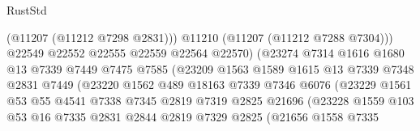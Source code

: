 \begin{lexlean}{RustStd}
\begin{coremodule}
                                      (@11207 (@11212 @7298 @2831)))
                                    @11210
                                    (@11207 (@11212 @7288 @7304)))
                                  @22549
                                  @22552
                                  @22555
                                  @22559
                                  @22564
                                  @22570)
                                (@23274
                                  @7314
                                  @1616
                                  @1680
                                  @13
                                  @7339
                                  @7449
                                  @7475
                                  @7585
                                  (@23209
                                    @1563
                                    @1589
                                    @1615
                                    @13
                                    @7339
                                    @7348
                                    @2831
                                    @7449
                                    (@23220
                                      @1562
                                      @489
                                      @18163
                                      @7339
                                      @7346
                                      @6076
                                      (@23229
                                        @1561
                                        @53
                                        @55
                                        @4541
                                        @7338
                                        @7345
                                        @2819
                                        @7319
                                        @2825
                                        @21696
                                        (@23228
                                          @1559
                                          @103
                                          @53
                                          @16
                                          @7335
                                          @2831
                                          @2844
                                          @2819
                                          @7329
                                          @2825
                                          (@21656
                                            @1558
                                            @7335

\end{coremodule}
\end{lexlean}
